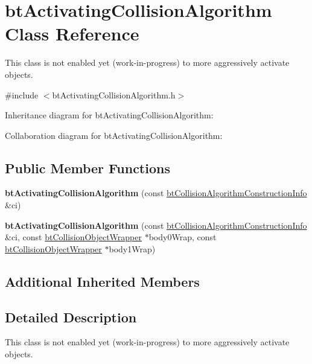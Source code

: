 \hypertarget{classbt_activating_collision_algorithm}{\section{bt\+Activating\+Collision\+Algorithm Class Reference}
\label{classbt_activating_collision_algorithm}
}


This class is not enabled yet (work-\/in-\/progress) to more aggressively activate objects.  




{\ttfamily \#include $<$bt\+Activating\+Collision\+Algorithm.\+h$>$}



Inheritance diagram for bt\+Activating\+Collision\+Algorithm\+:


Collaboration diagram for bt\+Activating\+Collision\+Algorithm\+:
\subsection*{Public Member Functions}
\begin{DoxyCompactItemize}
\item 
\hypertarget{classbt_activating_collision_algorithm_a8445dd4e3085b72cd76c9773fccea861}{{\bfseries bt\+Activating\+Collision\+Algorithm} (const \hyperlink{structbt_collision_algorithm_construction_info}{bt\+Collision\+Algorithm\+Construction\+Info} \&ci)}\label{classbt_activating_collision_algorithm_a8445dd4e3085b72cd76c9773fccea861}

\item 
\hypertarget{classbt_activating_collision_algorithm_a18fd97f6b072beb8d3a6da153e831441}{{\bfseries bt\+Activating\+Collision\+Algorithm} (const \hyperlink{structbt_collision_algorithm_construction_info}{bt\+Collision\+Algorithm\+Construction\+Info} \&ci, const \hyperlink{structbt_collision_object_wrapper}{bt\+Collision\+Object\+Wrapper} $\ast$body0\+Wrap, const \hyperlink{structbt_collision_object_wrapper}{bt\+Collision\+Object\+Wrapper} $\ast$body1\+Wrap)}\label{classbt_activating_collision_algorithm_a18fd97f6b072beb8d3a6da153e831441}

\end{DoxyCompactItemize}
\subsection*{Additional Inherited Members}


\subsection{Detailed Description}
This class is not enabled yet (work-\/in-\/progress) to more aggressively activate objects. 

